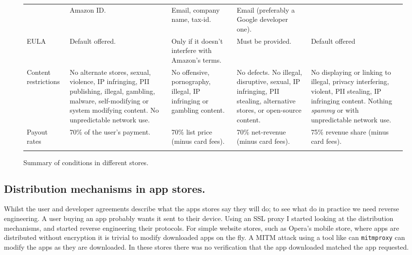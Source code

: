 \documentclass[a4paper]{scrartcl}
\begin{document}
\begin{figure}[!h]
\begin{tabulary}{\linewidth}{lLLLL}
                     & Amazon ID.
                     & Email, company name, tax-id.
                     & Email (preferably a Google developer one).                                                                                                                        \\ \addlinespace
EULA                 & Default offered.
                     & Only if it doesn't interfere with Amazon's terms.
                     & Must be provided.
                     & Default offered                                                                                                                                                   \\ \addlinespace
Content restrictions & No alternate stores, sexual, violence, IP infringing, PII publishing, illegal, gambling, malware, self-modifying or system modifying content.  No unpredictable network use.
                     & No offensive, pornography, illegal, IP infringing or gambling content.
                     & No defects. No illegal, disruptive, sexual, IP infringing, PII stealing, alternative stores, or open-source content.
                     & No displaying or linking to illegal, privacy interfering, violent, PII stealing, IP infringing content.  Nothing \emph{spammy} or with unpredictable network use. \\ \addlinespace
Payout rates         & 70\% of the user's payment.
                     & 70\% list price (minus card fees).
                     & 70\% net-revenue (minus card fees).
                     & 75\% revenue share (minus card fees).                                                                                                                             \\ \addlinespace
\bottomrule
\end{tabulary}
\caption{Summary of conditions in different stores.}
\label{tab:terms}
\end{figure}

\subsection{Distribution mechanisms in app stores.}

Whilst the user and developer agreements describe what the apps stores say they will do; to see what do in practice we need reverse engineering.
A user buying an app probably wants it sent to their device.
Using an SSL proxy I started looking at the distribution mechanisms, and started reverse engineering their protocols.
For simple website stores, such as Opera's mobile store, where apps are distributed without encryption it is trivial to modify downloaded apps on the fly.
A \ac{MITM} attack using a tool like can \texttt{mitmproxy} can modify the apps as they are downloaded.
In these stores there was no verification that the app downloaded matched the app requested.
\end{document}
